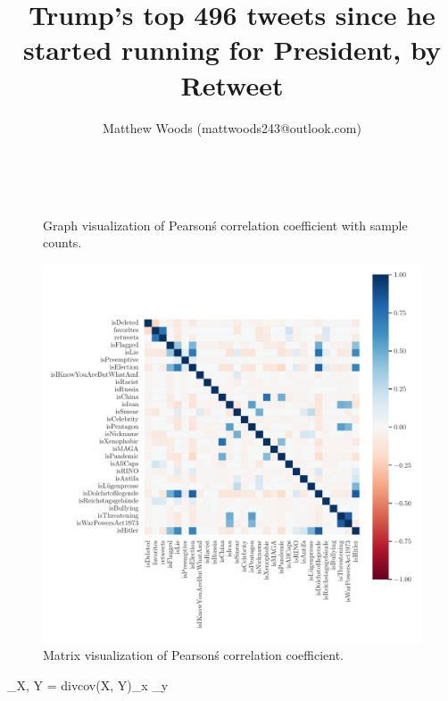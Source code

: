 \documentclass{article}
\begin{document}
    \title{Trump's top 496 tweets since he started running for President, by Retweet}
    \author{Matthew Woods (mattwoods243@outlook.com)}
    \
    \maketitle
    \begin{figure}
         \hspace{-1.5cm}
         
         \caption{Graph visualization of Pearson\'s correlation coefficient with sample counts.}
    \end{figure}
 
    \begin{figure}
         \vspace{-4cm}
         \hspace{-3cm}
         \includegraphics[scale=.8]{corr_heatmap.pdf}
         \caption{Matrix visualization of Pearson\'s correlation coefficient.}
    \end{figure}
    
    \rho_{X, Y} = div{cov(X, Y)}{\sigma_x \sigma_y}
\end{document}
